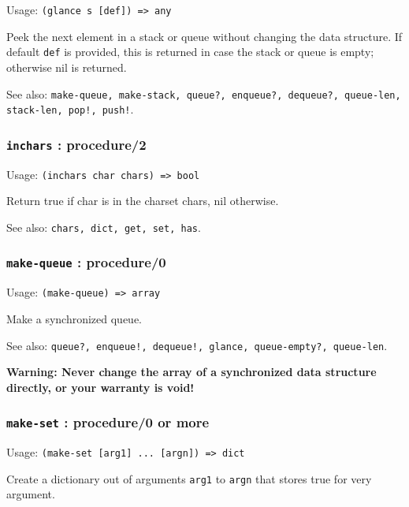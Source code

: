 \documentclass[
]{article}
\newcommand{\passthrough}[1]{#1}
\begin{document}
Usage: \passthrough{\lstinline!(glance s [def]) => any!}

Peek the next element in a stack or queue without changing the data
structure. If default \passthrough{\lstinline!def!} is provided, this is
returned in case the stack or queue is empty; otherwise nil is returned.

See also:
\passthrough{\lstinline"make-queue, make-stack, queue?, enqueue?, dequeue?, queue-len, stack-len, pop!, push!"}.

\hypertarget{inchars-procedure2}{%
\subsubsection{\texorpdfstring{\texttt{inchars} :
procedure/2}{inchars : procedure/2}}\label{inchars-procedure2}}

Usage: \passthrough{\lstinline!(inchars char chars) => bool!}

Return true if char is in the charset chars, nil otherwise.

See also: \passthrough{\lstinline!chars, dict, get, set, has!}.

\hypertarget{make-queue-procedure0}{%
\subsubsection{\texorpdfstring{\texttt{make-queue} :
procedure/0}{make-queue : procedure/0}}\label{make-queue-procedure0}}

Usage: \passthrough{\lstinline!(make-queue) => array!}

Make a synchronized queue.

See also:
\passthrough{\lstinline"queue?, enqueue!, dequeue!, glance, queue-empty?, queue-len"}.

\textbf{Warning: Never change the array of a synchronized data structure
directly, or your warranty is void!}

\hypertarget{make-set-procedure0-or-more}{%
\subsubsection{\texorpdfstring{\texttt{make-set} : procedure/0 or
more}{make-set : procedure/0 or more}}\label{make-set-procedure0-or-more}}

Usage: \passthrough{\lstinline!(make-set [arg1] ... [argn]) => dict!}

Create a dictionary out of arguments \passthrough{\lstinline!arg1!} to
\passthrough{\lstinline!argn!} that stores true for very argument.
\end{document}
